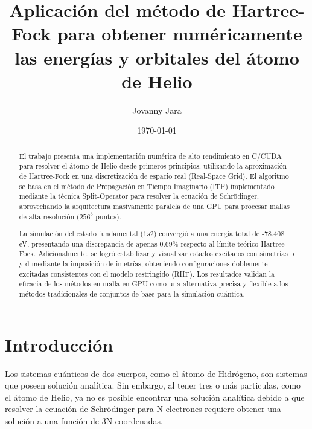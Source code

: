 \documentclass[aps,twocolumn,preprintnumbers]{revtex4}
\begin{document}
  \title{Aplicación del método de Hartree-Fock para obtener numéricamente las energías y orbitales del átomo de Helio}

  \author{Jovanny Jara}


  \date{\today}

  \begin{abstract}

    El trabajo presenta una implementación numérica de alto rendimiento en C/CUDA para resolver el átomo de Helio desde primeros principios, utilizando la aproximación de Hartree-Fock en una discretización de espacio real (Real-Space Grid). El algoritmo se basa en el método de Propagación en Tiempo Imaginario (ITP) implementado mediante la técnica Split-Operator para resolver la ecuación de Schrödinger, aprovechando la arquitectura masivamente paralela de una GPU para procesar mallas de alta resolución ($256^3$ puntos).

    La simulación del estado fundamental ($1s2$) convergió a una energía total de -78.408 eV, presentando una discrepancia de apenas $0.69\%$ respecto al límite teórico Hartree-Fock. Adicionalmente, se logró estabilizar y visualizar estados excitados con simetrías p y d mediante la imposición de imetrías, obteniendo configuraciones doblemente excitadas consistentes con el modelo restringido (RHF). Los resultados validan la eficacia de los métodos en malla en GPU como una alternativa precisa y flexible a los métodos tradicionales de conjuntos de base para la simulación cuántica.

  \end{abstract}

  \maketitle

  \section{Introducción}


  Los sistemas cuánticos de dos cuerpos, como el átomo de Hidrógeno, son sistemas que poseen solución analítica. Sin embargo, al tener tres o más particulas, como el átomo de Helio, ya no es posible encontrar una solución analítica debido a que resolver la ecuación de Schrödinger para N electrones requiere obtener una solución a una función de 3N coordenadas.
\end{document}
